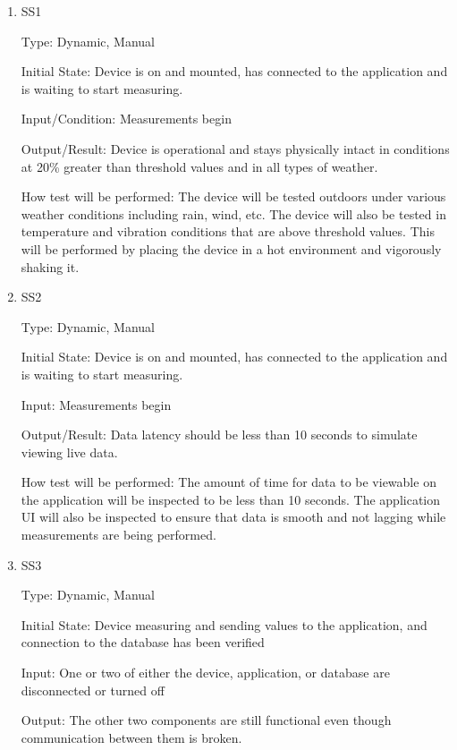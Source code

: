 \documentclass[12pt, titlepage]{article}
\begin{document}
\begin{enumerate}

\item{SS1\\}

Type: Dynamic, Manual
					
Initial State: Device is on and mounted, has connected to the application and is waiting to start measuring.
					
Input/Condition: Measurements begin
					
Output/Result: Device is operational and stays physically intact in conditions at 20\% greater than threshold values and in all types of weather.
					
How test will be performed: The device will be tested outdoors under various weather conditions including rain, wind, etc.
The device will also be tested in temperature and vibration conditions that are above threshold values. This will be performed by placing the device in a hot environment
and vigorously shaking it.
					
\item{SS2\\}

Type: Dynamic, Manual
					
Initial State: Device is on and mounted, has connected to the application and is waiting to start measuring.
					
Input: Measurements begin
					
Output/Result: Data latency should be less than 10 seconds to simulate viewing live data.
					
How test will be performed: The amount of time for data to be viewable on the application will be inspected to be less than 10 seconds.
The application UI will also be inspected to ensure that data is smooth and not lagging while measurements are being performed.

\item{SS3\\}

Type: Dynamic, Manual
					
Initial State: Device measuring and sending values to the application, and connection to the database has been verified
					
Input: One or two of either the device, application, or database are disconnected or turned off
					
Output: The other two components are still functional even though communication between them is broken.
					

\end{enumerate}
\end{document}
